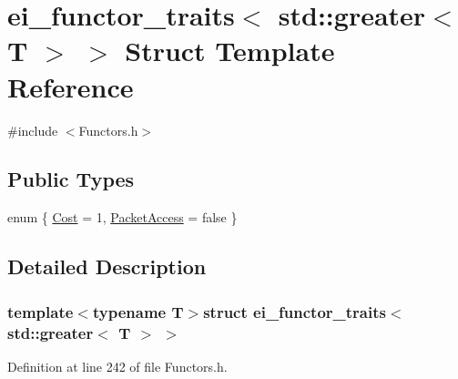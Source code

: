 \hypertarget{structei__functor__traits_3_01std_1_1greater_3_01_t_01_4_01_4}{\section{ei\-\_\-functor\-\_\-traits$<$ std\-:\-:greater$<$ T $>$ $>$ Struct Template Reference}
\label{structei__functor__traits_3_01std_1_1greater_3_01_t_01_4_01_4}
}


{\ttfamily \#include $<$Functors.\-h$>$}

\subsection*{Public Types}
\begin{DoxyCompactItemize}
\item 
enum \{ \hyperlink{structei__functor__traits_3_01std_1_1greater_3_01_t_01_4_01_4_a02fa9513afaba065a847bbc451544de4a5f15cabb352ab10c5f404544b13e8f3c}{Cost} = 1, 
\hyperlink{structei__functor__traits_3_01std_1_1greater_3_01_t_01_4_01_4_a02fa9513afaba065a847bbc451544de4abf92cf54714ae07b9fdbaca2d71cb7f3}{Packet\-Access} = false
 \}
\end{DoxyCompactItemize}


\subsection{Detailed Description}
\subsubsection*{template$<$typename T$>$struct ei\-\_\-functor\-\_\-traits$<$ std\-::greater$<$ T $>$ $>$}



Definition at line 242 of file Functors.\-h.



